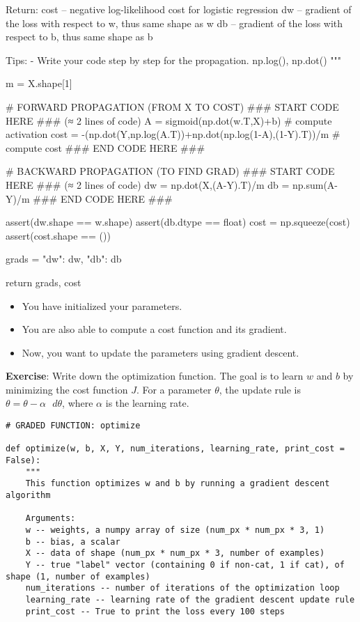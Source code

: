 {{\begin{mypython}
    Return:
    cost -- negative log-likelihood cost for logistic regression
    dw -- gradient of the loss with respect to w, thus same shape as w
    db -- gradient of the loss with respect to b, thus same shape as b
    
    Tips:
    - Write your code step by step for the propagation. np.log(), np.dot()
    """
    
    m = X.shape[1]
    
    # FORWARD PROPAGATION (FROM X TO COST)
    ### START CODE HERE ### (≈ 2 lines of code)
    A =  sigmoid(np.dot(w.T,X)+b)    # compute activation
    cost =  -(np.dot(Y,np.log(A.T))+np.dot(np.log(1-A),(1-Y).T))/m  # compute cost
    ### END CODE HERE ###
    
    # BACKWARD PROPAGATION (TO FIND GRAD)
    ### START CODE HERE ### (≈ 2 lines of code)
    dw = np.dot(X,(A-Y).T)/m
    db = np.sum(A-Y)/m
    ### END CODE HERE ###

    assert(dw.shape == w.shape)
    assert(db.dtype == float)
    cost = np.squeeze(cost)
    assert(cost.shape == ())
    
    grads = {"dw": dw,
             "db": db}
    
    return grads, cost
\end{mypython}



\begin{itemize}
\item You have initialized your parameters.
\item You are also able to compute a cost function and its gradient.
\item Now, you want to update the parameters using gradient descent.
\end{itemize}

{\textbf {Exercise}}: Write down the optimization function. The goal is to learn $w$ and $b$ by minimizing the cost function $J$. For a parameter $\theta$, the update rule is $ \theta = \theta - \alpha \text{ } d\theta$, where $\alpha$ is the learning rate.

\begin{verbatim}
# GRADED FUNCTION: optimize

def optimize(w, b, X, Y, num_iterations, learning_rate, print_cost = False):
    """
    This function optimizes w and b by running a gradient descent algorithm
    
    Arguments:
    w -- weights, a numpy array of size (num_px * num_px * 3, 1)
    b -- bias, a scalar
    X -- data of shape (num_px * num_px * 3, number of examples)
    Y -- true "label" vector (containing 0 if non-cat, 1 if cat), of shape (1, number of examples)
    num_iterations -- number of iterations of the optimization loop
    learning_rate -- learning rate of the gradient descent update rule
    print_cost -- True to print the loss every 100 steps
    

\end{verbatim}}}
